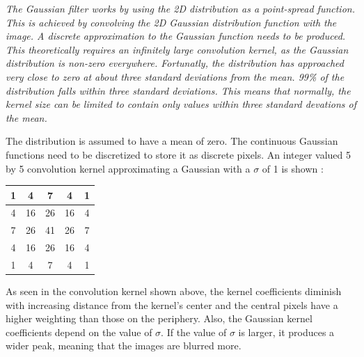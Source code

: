 \emph{\color{green}The Gaussian filter works by using the 2D distribution as a point-spread function. This is achieved by convolving the 2D Gaussian distribution function with the image. A discrete approximation to the Gaussian function needs to be produced. This theoretically requires an infinitely large convolution kernel, as the Gaussian distribution is non-zero everywhere. Fortunatly, the distribution has approached very close to zero at about three standard deviations from the mean. 99\% of the distribution falls within three standard deviations. This means that normally, the kernel size can be limited to contain only values within three standard devations of the mean.}

The distribution is assumed to have a mean of zero. The continuous Gaussian functions need to be discretized to store it as discrete pixels. An integer valued 5 by 5 convolution kernel approximating a Gaussian with a $ \sigma $ of 1 is shown : 




\begin{center}
\begin{tabular}{ | c | c | c | c | c |} \hline
  
  1 & 4  & 7  & 4  & 1  \\ \hline  
  4 & 16 & 26 & 16 & 4   \\ \hline  
  7 & 26 & 41 & 26 & 7   \\ \hline 
  4 & 16 & 26 & 16 & 4   \\ \hline 
  1 & 4  & 7  & 4  & 1  \\ \hline   
    
      \end{tabular}
  \label{tab:GaussianBlur}
\end{center}


As seen in the convolution kernel shown above, the kernel coefficients diminish with increasing distance from the kernel's center and the central pixels have a higher weighting than those on the periphery. Also, the Gaussian kernel coefficients depend on the value of $\sigma$. If the value of $\sigma$ is larger, it produces a wider peak, meaning that the images are blurred more.





















